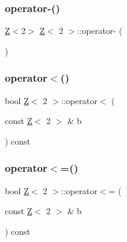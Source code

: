 \subsubsection{\texorpdfstring{operator-\/()}{operator-()}\hspace{0.1cm}{\footnotesize\ttfamily [2/2]}}
{\footnotesize\ttfamily \hyperlink{classZ}{Z}$<$2$>$ \hyperlink{classZ}{Z}$<$ 2 $>$\+::operator-\/ (\begin{DoxyParamCaption}{ }\end{DoxyParamCaption})\hspace{0.3cm}{\ttfamily [inline]}}

\mbox{\label{classZ_3_012_01_4_aec8e51a2935d539f11220270f35c1c31}} 
\subsubsection{\texorpdfstring{operator$<$()}{operator<()}}
{\footnotesize\ttfamily bool \hyperlink{classZ}{Z}$<$ 2 $>$\+::operator$<$ (\begin{DoxyParamCaption}\item[{const \hyperlink{classZ}{Z}$<$ 2 $>$ \&}]{b }\end{DoxyParamCaption}) const\hspace{0.3cm}{\ttfamily [inline]}}

\mbox{\label{classZ_3_012_01_4_a6e1b77419935d4f017ffab84df3ca520}} 
\subsubsection{\texorpdfstring{operator$<$=()}{operator<=()}}
{\footnotesize\ttfamily bool \hyperlink{classZ}{Z}$<$ 2 $>$\+::operator$<$= (\begin{DoxyParamCaption}\item[{const \hyperlink{classZ}{Z}$<$ 2 $>$ \&}]{b }\end{DoxyParamCaption}) const\hspace{0.3cm}{\ttfamily [inline]}}

\mbox{\label{classZ_3_012_01_4_a98508d39c9695bdda292044170ef5718}} 
